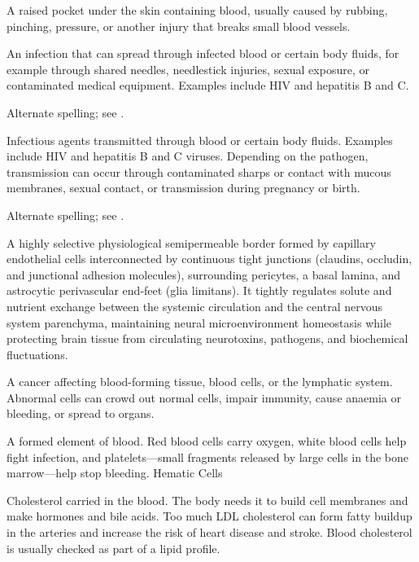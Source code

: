  A raised pocket under the skin containing blood, usually caused by rubbing, pinching, pressure, or another injury that breaks small blood vessels.

 An infection that can spread through infected blood or certain body fluids, for example through shared needles, needlestick injuries, sexual exposure, or contaminated medical equipment. Examples include HIV and hepatitis B and C.

 Alternate spelling; see .

 Infectious agents transmitted through blood or certain body fluids. Examples include HIV and hepatitis B
and C viruses. Depending on the pathogen, transmission can occur through contaminated sharps or contact with mucous
membranes, sexual contact, or transmission during pregnancy or birth.

 Alternate spelling; see .

 A highly selective physiological semipermeable border formed by capillary endothelial cells interconnected by continuous tight junctions (claudins, occludin, and junctional adhesion molecules), surrounding pericytes, a basal lamina, and astrocytic perivascular end-feet (glia limitans). It tightly regulates solute and nutrient exchange between the systemic circulation and the central nervous system parenchyma, maintaining neural microenvironment homeostasis while protecting brain tissue from circulating neurotoxins, pathogens, and biochemical fluctuations.

 A cancer affecting blood-forming tissue, blood cells, or the lymphatic system. Abnormal cells can crowd out normal cells, impair immunity, cause anaemia or bleeding, or spread to organs.

 A formed element of blood. Red blood cells carry oxygen, white blood cells help fight infection, and platelets—small fragments released by large cells in the bone marrow—help stop bleeding.
\synonyms
Hematic Cells

 Cholesterol carried in the blood. The body needs it to build cell membranes and make hormones and bile acids. Too much LDL cholesterol can form fatty buildup in the arteries and increase the risk of heart disease and stroke. Blood cholesterol is usually checked as part of a lipid profile.

